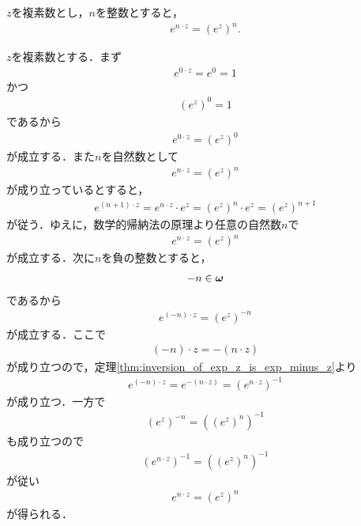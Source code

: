 	\begin{screen}
		\begin{thm}[指数関数の整数乗]
			$z$を複素数とし，$n$を整数とすると，
			\begin{align}
				e^{n \cdot z} = (e^z)^n.
			\end{align}
		\end{thm}
	\end{screen}
	
	\begin{sketch}
		$z$を複素数とする．まず
		\begin{align}
			e^{0 \cdot z} = e^0 = 1
		\end{align}
		かつ
		\begin{align}
			(e^z)^0 = 1
		\end{align}
		であるから
		\begin{align}
			e^{0 \cdot z} = (e^z)^0
		\end{align}
		が成立する．また$n$を自然数として
		\begin{align}
			e^{n \cdot z} = (e^z)^n
		\end{align}
		が成り立っているとすると，
		\begin{align}
			e^{(n+1) \cdot z}
			= e^{n \cdot z} \cdot e^z
			= (e^z)^n \cdot e^z
			= (e^z)^{n+1}
		\end{align}
		が従う．ゆえに，数学的帰納法の原理より任意の自然数$n$で
		\begin{align}
			e^{n \cdot z} = (e^z)^n
		\end{align}
		が成立する．次に$n$を負の整数とすると，
		\begin{align}
			-n \in {\boldsymbol \omega}
		\end{align}
		であるから
		\begin{align}
			e^{(-n) \cdot z} = (e^z)^{-n}
		\end{align}
		が成立する．ここで
		\begin{align}
			(-n) \cdot z = -(n \cdot z)
		\end{align}
		が成り立つので，定理\ref{thm:inversion_of_exp_z_is_exp_minus_z}より
		\begin{align}
			e^{(-n) \cdot z} = e^{-(n \cdot z)} = (e^{n \cdot z})^{-1}
		\end{align}
		が成り立つ．一方で
		\begin{align}
			(e^z)^{-n} = ((e^z)^n)^{-1}
		\end{align}
		も成り立つので
		\begin{align}
			(e^{n \cdot z})^{-1} = ((e^z)^n)^{-1}
		\end{align}
		が従い
		\begin{align}
			e^{n \cdot z} = (e^z)^n
		\end{align}
		が得られる．
		\QED
	\end{sketch}
	
